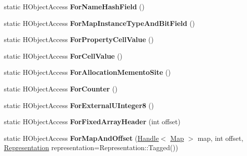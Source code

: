 \begin{DoxyCompactItemize}
\item 
\hypertarget{classv8_1_1internal_1_1_v8___f_i_n_a_l_a0d5b82872f7da57d0ce3900d120812d5}{}static H\+Object\+Access {\bfseries For\+Name\+Hash\+Field} ()\label{classv8_1_1internal_1_1_v8___f_i_n_a_l_a0d5b82872f7da57d0ce3900d120812d5}

\item 
\hypertarget{classv8_1_1internal_1_1_v8___f_i_n_a_l_a7637f222f6adeebf240236025d0f324a}{}static H\+Object\+Access {\bfseries For\+Map\+Instance\+Type\+And\+Bit\+Field} ()\label{classv8_1_1internal_1_1_v8___f_i_n_a_l_a7637f222f6adeebf240236025d0f324a}

\item 
\hypertarget{classv8_1_1internal_1_1_v8___f_i_n_a_l_ab503b96324e14402f6fb0484507d121c}{}static H\+Object\+Access {\bfseries For\+Property\+Cell\+Value} ()\label{classv8_1_1internal_1_1_v8___f_i_n_a_l_ab503b96324e14402f6fb0484507d121c}

\item 
\hypertarget{classv8_1_1internal_1_1_v8___f_i_n_a_l_a87696618b327f6796c5e2713d88c41ce}{}static H\+Object\+Access {\bfseries For\+Cell\+Value} ()\label{classv8_1_1internal_1_1_v8___f_i_n_a_l_a87696618b327f6796c5e2713d88c41ce}

\item 
\hypertarget{classv8_1_1internal_1_1_v8___f_i_n_a_l_a65de5cf677678248e50ebc84b3eb6e7f}{}static H\+Object\+Access {\bfseries For\+Allocation\+Memento\+Site} ()\label{classv8_1_1internal_1_1_v8___f_i_n_a_l_a65de5cf677678248e50ebc84b3eb6e7f}

\item 
\hypertarget{classv8_1_1internal_1_1_v8___f_i_n_a_l_ac2d2a80c960fd35ce7fd50699f41bce7}{}static H\+Object\+Access {\bfseries For\+Counter} ()\label{classv8_1_1internal_1_1_v8___f_i_n_a_l_ac2d2a80c960fd35ce7fd50699f41bce7}

\item 
\hypertarget{classv8_1_1internal_1_1_v8___f_i_n_a_l_a407faee584f97ea12cd5e167d33599f4}{}static H\+Object\+Access {\bfseries For\+External\+U\+Integer8} ()\label{classv8_1_1internal_1_1_v8___f_i_n_a_l_a407faee584f97ea12cd5e167d33599f4}

\item 
\hypertarget{classv8_1_1internal_1_1_v8___f_i_n_a_l_abf68128eb2d658ea3db26bbd689de713}{}static H\+Object\+Access {\bfseries For\+Fixed\+Array\+Header} (int offset)\label{classv8_1_1internal_1_1_v8___f_i_n_a_l_abf68128eb2d658ea3db26bbd689de713}

\item 
\hypertarget{classv8_1_1internal_1_1_v8___f_i_n_a_l_a6310c1772d42edefe6e48fa588e2aabe}{}static H\+Object\+Access {\bfseries For\+Map\+And\+Offset} (\hyperlink{classv8_1_1internal_1_1_handle}{Handle}$<$ \hyperlink{classv8_1_1internal_1_1_map}{Map} $>$ map, int offset, \hyperlink{classv8_1_1internal_1_1_representation}{Representation} representation=Representation\+::\+Tagged())\label{classv8_1_1internal_1_1_v8___f_i_n_a_l_a6310c1772d42edefe6e48fa588e2aabe}


\end{DoxyCompactItemize}
